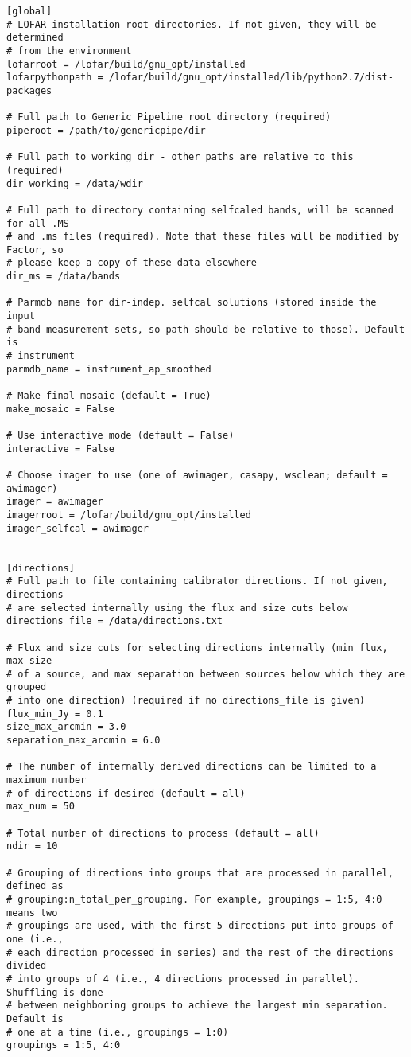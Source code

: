 \documentclass[structabstract]{article}
\begin{document}
\begin{verbatim}
[global]
# LOFAR installation root directories. If not given, they will be determined
# from the environment
lofarroot = /lofar/build/gnu_opt/installed
lofarpythonpath = /lofar/build/gnu_opt/installed/lib/python2.7/dist-packages

# Full path to Generic Pipeline root directory (required)
piperoot = /path/to/genericpipe/dir

# Full path to working dir - other paths are relative to this (required)
dir_working = /data/wdir

# Full path to directory containing selfcaled bands, will be scanned for all .MS
# and .ms files (required). Note that these files will be modified by Factor, so
# please keep a copy of these data elsewhere
dir_ms = /data/bands

# Parmdb name for dir-indep. selfcal solutions (stored inside the input
# band measurement sets, so path should be relative to those). Default is
# instrument
parmdb_name = instrument_ap_smoothed

# Make final mosaic (default = True)
make_mosaic = False

# Use interactive mode (default = False)
interactive = False

# Choose imager to use (one of awimager, casapy, wsclean; default = awimager)
imager = awimager
imagerroot = /lofar/build/gnu_opt/installed
imager_selfcal = awimager


[directions]
# Full path to file containing calibrator directions. If not given, directions
# are selected internally using the flux and size cuts below
directions_file = /data/directions.txt

# Flux and size cuts for selecting directions internally (min flux, max size
# of a source, and max separation between sources below which they are grouped
# into one direction) (required if no directions_file is given)
flux_min_Jy = 0.1
size_max_arcmin = 3.0
separation_max_arcmin = 6.0

# The number of internally derived directions can be limited to a maximum number
# of directions if desired (default = all)
max_num = 50

# Total number of directions to process (default = all)
ndir = 10

# Grouping of directions into groups that are processed in parallel, defined as
# grouping:n_total_per_grouping. For example, groupings = 1:5, 4:0 means two
# groupings are used, with the first 5 directions put into groups of one (i.e.,
# each direction processed in series) and the rest of the directions divided
# into groups of 4 (i.e., 4 directions processed in parallel). Shuffling is done
# between neighboring groups to achieve the largest min separation. Default is
# one at a time (i.e., groupings = 1:0)
groupings = 1:5, 4:0



\end{verbatim}
\end{document}
